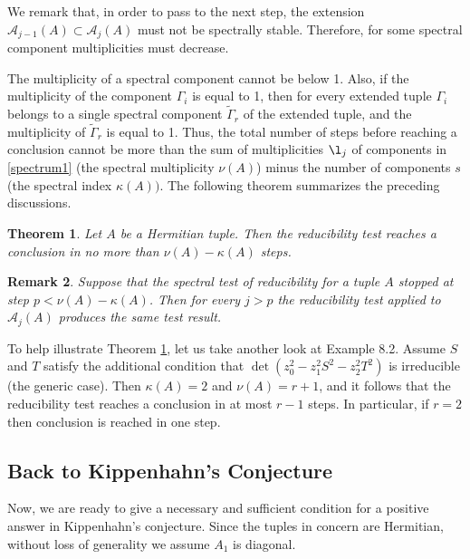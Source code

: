 \documentclass[draft, 12pt, reqno]{amsart}
\numberwithin{equation}{section}
\theoremstyle{plain}
\newtheorem{theorem}{Theorem}[section]
\newtheorem{remark}[theorem]{Remark}
\begin{document}
\vspace{.2cm}

We remark that, in order to pass to the next step, the extension $\mathcal{A}_{j-1}(A)\subset \mathcal{A}_j(A)$ must not be spectrally stable.  
Therefore, for some spectral component multiplicities must decrease. 

The multiplicity of a spectral component cannot be below 1. Also, if the multiplicity of the component $\Gamma_i$ is equal to 1, then for every extended tuple $\Gamma_i$ belongs to a single spectral component $\widetilde{\Gamma}_r$ of the extended tuple, and the multiplicity of $\widetilde{\Gamma}_r$ is equal to 1. 
Thus, the total number of steps before reaching a conclusion cannot be more  than the sum of multiplicities $\l_j$ of components in \eqref{spectrum1} (the spectral multiplicity $\nu(A)$) minus the number of components $s$ (the spectral index $\kappa(A))$. The following theorem summarizes the preceding discussions.

\begin{theorem}\label{test}
Let $A$ be a Hermitian tuple. Then the reducibility test reaches a conclusion in no more than $\nu(A)-\kappa(A)$ steps.	
\end{theorem}

\begin{remark} \normalfont Suppose that the spectral test of reducibility for a tuple $A$ stopped at step $p<\nu(A)-\kappa(A)$. Then for every $j>p$ the reducibility test applied to $\mathcal{A}_j(A)$ produces the same test result. 
\end{remark}

To help illustrate Theorem \ref{test}, let us take another look at Example 8.2. Assume $S$ and $T$ satisfy the additional condition that $\det(z_0^2-z_1^2S^2-z_2^2T^2)$ is irreducible (the generic case). Then $\kappa(A)=2$ and $\nu(A)=r+1$, and it follows that the reducibility test reaches a conclusion in at most $r-1$ steps. In particular, if $r=2$ then conclusion is reached in one step.


\vspace{.2cm}

\subsection{Back to Kippenhahn's Conjecture} Now, we are ready to give a necessary and sufficient condition for a positive answer in Kippenhahn's conjecture. Since the tuples in concern are Hermitian, without loss of generality we assume $A_1$ is diagonal.
\end{document}
